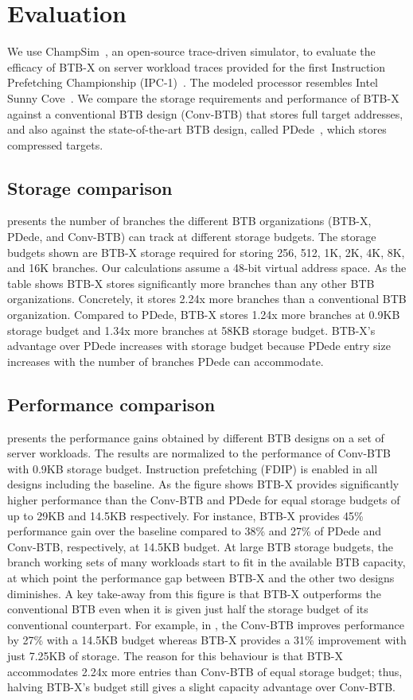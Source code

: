 \section{Evaluation}

We use ChampSim~\cite{champsim}, an open-source trace-driven simulator, to evaluate the efficacy of BTB-X on server workload traces provided for the first Instruction Prefetching Championship (IPC-1)~\cite{ipc1}. The modeled processor resembles Intel Sunny Cove~\cite{sunnycove}. We compare the storage requirements and performance of BTB-X against a conventional BTB design (Conv-BTB) that stores full target addresses, and also against the state-of-the-art BTB design, called PDede~\cite{pdede}, which stores compressed targets.

\subsection{Storage comparison}
 presents the number of branches the different BTB organizations (BTB-X, PDede, and Conv-BTB) can track at different storage budgets. The storage budgets shown are BTB-X storage required for storing 256, 512, 1K, 2K, 4K, 8K, and 16K branches. Our calculations assume a 48-bit virtual address space. As the table shows BTB-X stores significantly more branches than any other BTB organizations. Concretely, it stores 2.24x more branches than a conventional BTB organization. Compared to PDede, BTB-X stores 1.24x more branches at 0.9KB storage budget and 1.34x more branches at 58KB storage budget. BTB-X's advantage over PDede increases with storage budget because PDede entry size increases with the number of branches PDede can accommodate. 

\subsection{Performance comparison}
 presents the performance gains obtained by different BTB designs on a set of server workloads. The results are normalized to the performance of Conv-BTB with 0.9KB storage budget. Instruction prefetching (FDIP) is enabled in all designs including the baseline. As the figure shows BTB-X provides significantly higher performance than the Conv-BTB and PDede for equal storage budgets of up to 29KB and 14.5KB respectively. For instance, BTB-X provides 45\% performance gain over the baseline compared to 38\% and 27\% of PDede and Conv-BTB, respectively, at 14.5KB budget. At large BTB storage budgets, the branch working sets of many workloads start to fit in the available BTB capacity, at which point the performance gap between BTB-X and the other two designs diminishes. A key take-away from this figure is that BTB-X outperforms the conventional BTB even when it is given just half the storage budget of its conventional counterpart. For example, in , the Conv-BTB improves performance by 27\% with a 14.5KB budget whereas BTB-X provides a 31\% improvement with just 7.25KB of storage. The reason for this behaviour is that BTB-X accommodates 2.24x more entries than Conv-BTB of equal storage budget; thus, halving BTB-X's budget still gives a slight capacity advantage over Conv-BTB.

